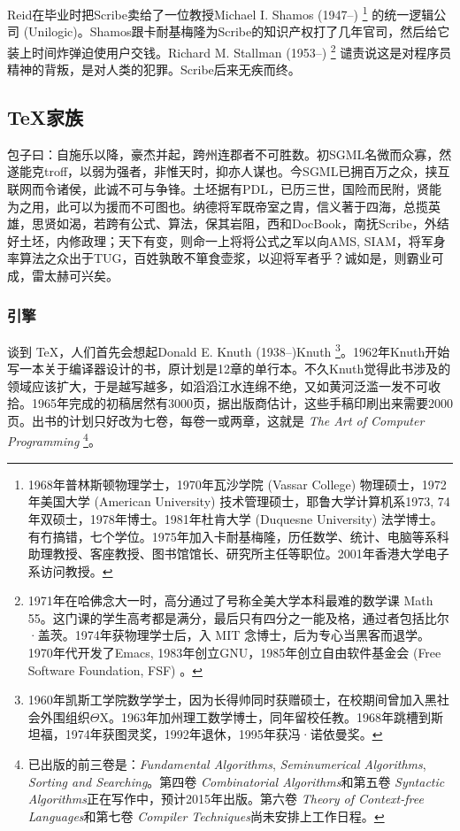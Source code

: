 Reid在毕业时把Scribe卖给了一位教授Michael I. Shamos (1947--)\indexShamos{}  \footnote{1968年普林斯顿物理学士，1970年瓦沙学院 (Vassar College) 物理硕士，1972年美国大学 (American University) 技术管理硕士，耶鲁大学计算机系1973, 74年双硕士，1978年博士。1981年杜肯大学 (Duquesne University) 法学博士。有冇搞错，七个学位。1975年加入卡耐基梅隆，历任数学、统计、电脑等系科助理教授、客座教授、图书馆馆长、研究所主任等职位。2001年香港大学电子系访问教授。} 的统一逻辑公司 (Unilogic)\indexUnilogic。Shamos跟卡耐基梅隆为Scribe的知识产权打了几年官司，然后给它装上时间炸弹迫使用户交钱。Richard M. Stallman (1953--)\indexStallman{} \footnote{1971年在哈佛念大一时，高分通过了号称全美大学本科最难的数学课 Math 55。这门课的学生高考都是满分，最后只有四分之一能及格，通过者包括比尔·盖茨。1974年获物理学士后，入 MIT 念博士，后为专心当黑客而退学。1970年代开发了Emacs, 1983年创立GNU，1985年创立自由软件基金会 (Free Software Foundation, FSF) 。} 谴责说这是对程序员精神的背叛，是对人类的犯罪。Scribe后来无疾而终。

\subsection{\TeX 家族}
\label{sec:tex}

包子曰：自施乐以降，豪杰并起，跨州连郡者不可胜数。初SGML名微而众寡，然遂能克troff，以弱为强者，非惟天时，抑亦人谋也。今SGML已拥百万之众，挟互联网而令诸侯，此诚不可与争锋。土坯据有PDL，已历三世，国险而民附，贤能为之用，此可以为援而不可图也。纳德将军既帝室之胄，信义著于四海，总揽英雄，思贤如渴，若跨有公式、算法，保其岩阻，西和DocBook，南抚Scribe，外结好土坯，内修政理；天下有变，则命一上将将公式之军以向AMS, SIAM，将军身率算法之众出于TUG，百姓孰敢不箪食壶浆，以迎将军者乎？诚如是，则霸业可成，雷太赫可兴矣。

\subsubsection{引擎}

谈到 \TeX ，人们首先会想起Donald E. Knuth (1938--)\index Knuth {} \footnote{1960年凯斯工学院数学学士，因为长得帅同时获赠硕士，在校期间曾加入黑社会外围组织$\Theta\mathrm{X}$。1963年加州理工数学博士，同年留校任教。1968年跳槽到斯坦福\indexStanford，1974年获图灵奖，1992年退休，1995年获冯·诺依曼奖。}。1962年Knuth开始写一本关于编译器设计的书，原计划是12章的单行本。不久Knuth觉得此书涉及的领域应该扩大，于是越写越多，如滔滔江水连绵不绝，又如黄河泛滥一发不可收拾。1965年完成的初稿居然有3000页，据出版商估计，这些手稿印刷出来需要2000页。出书的计划只好改为七卷，每卷一或两章，这就是 \emph{The Art of Computer Programming} \footnote{已出版的前三卷是：\emph{Fundamental Algorithms}, \emph{Seminumerical Algorithms}, \emph{Sorting and Searching}。第四卷 \emph{Combinatorial Algorithms}和第五卷 \emph{Syntactic Algorithms}正在写作中，预计2015年出版。第六卷 \emph{Theory of Context-free Languages}和第七卷 \emph{Compiler Techniques}尚未安排上工作日程。}。

